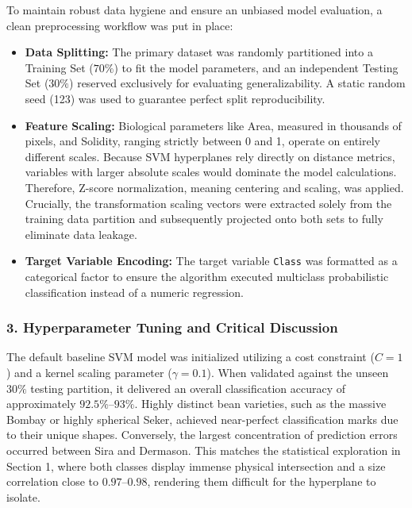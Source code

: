 \documentclass{article}
\begin{document}
To maintain robust data hygiene and ensure an unbiased model evaluation, a clean preprocessing workflow was put in place:

\begin{itemize}
    \item \textbf{Data Splitting:} The primary dataset was randomly partitioned into a Training Set ($70\%$) to fit the model parameters, and an independent Testing Set ($30\%$) reserved exclusively for evaluating generalizability. A static random seed (123) was used to guarantee perfect split reproducibility.
    \item \textbf{Feature Scaling:} Biological parameters like Area, measured in thousands of pixels, and Solidity, ranging strictly between 0 and 1, operate on entirely different scales. Because SVM hyperplanes rely directly on distance metrics, variables with larger absolute scales would dominate the model calculations. Therefore, Z-score normalization, meaning centering and scaling, was applied. Crucially, the transformation scaling vectors were extracted solely from the training data partition and subsequently projected onto both sets to fully eliminate data leakage.
    \item \textbf{Target Variable Encoding:} The target variable \texttt{Class} was formatted as a categorical factor to ensure the algorithm executed multiclass probabilistic classification instead of a numeric regression.
\end{itemize}

\subsubsection*{3. Hyperparameter Tuning and Critical Discussion}

The default baseline SVM model was initialized utilizing a cost constraint ($C = 1$) and a kernel scaling parameter ($\gamma = 0.1$). When validated against the unseen $30\%$ testing partition, it delivered an overall classification accuracy of approximately $92.5\%$--$93\%$. Highly distinct bean varieties, such as the massive Bombay or highly spherical Seker, achieved near-perfect classification marks due to their unique shapes. Conversely, the largest concentration of prediction errors occurred between Sira and Dermason. This matches the statistical exploration in Section 1, where both classes display immense physical intersection and a size correlation close to $0.97$--$0.98$, rendering them difficult for the hyperplane to isolate.
\end{document}
